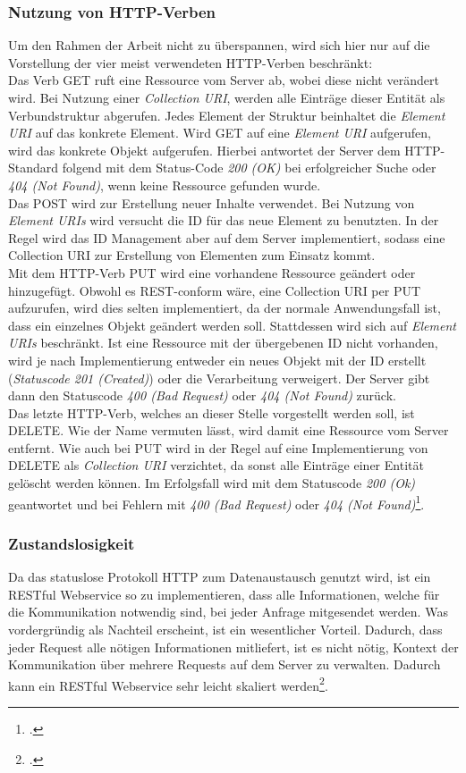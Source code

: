 \subsubsection*{Nutzung von HTTP-Verben}
Um den Rahmen der Arbeit nicht zu überspannen, wird sich hier nur auf die Vorstellung der vier meist verwendeten \ac{HTTP}-Verben beschränkt:\\
Das Verb GET ruft eine Ressource vom Server ab, wobei diese nicht verändert wird. Bei Nutzung einer \textit{Collection \ac{URI}}, werden alle Einträge dieser Entität als Verbundstruktur abgerufen. Jedes Element der Struktur beinhaltet die \textit{Element URI} auf das konkrete Element. Wird GET auf eine \textit{Element URI} aufgerufen, wird das konkrete Objekt aufgerufen. Hierbei antwortet der Server dem \ac{HTTP}-Standard folgend mit dem Status-Code \textit{200 (OK)} bei erfolgreicher Suche oder \textit{404 (Not Found)}, wenn keine Ressource gefunden wurde.\\
Das POST wird zur Erstellung neuer Inhalte verwendet. Bei Nutzung von \textit{Element \ac{URI}s} wird versucht die ID für das neue Element zu benutzten. In der Regel wird das ID Management aber auf dem Server implementiert, sodass eine Collection \ac{URI} zur Erstellung von Elementen zum Einsatz kommt.\\
Mit dem HTTP-Verb PUT wird eine vorhandene Ressource geändert oder hinzugefügt. Obwohl es \ac{REST}-conform wäre, eine Collection \ac{URI} per PUT aufzurufen, wird dies selten implementiert, da der normale Anwendungsfall ist, dass ein einzelnes Objekt geändert werden soll. Stattdessen wird sich auf \textit{Element \ac{URI}s} beschränkt. Ist eine Ressource mit der übergebenen ID nicht vorhanden, wird je nach Implementierung entweder ein neues Objekt mit der ID erstellt (\textit{Statuscode 201 (Created)}) oder die Verarbeitung verweigert. Der Server gibt dann den Statuscode \textit{400 (Bad Request)} oder \textit{404 (Not Found)}  zurück. \\
Das letzte HTTP-Verb, welches an dieser Stelle vorgestellt werden soll, ist DELETE. Wie der Name vermuten lässt, wird damit eine Ressource vom Server entfernt. Wie auch bei PUT wird in der Regel auf eine Implementierung von DELETE als \textit{Collection \ac{URI}} verzichtet, da sonst alle Einträge einer Entität gelöscht werden können. Im Erfolgsfall wird mit dem Statuscode \textit{200 (Ok)} geantwortet und bei Fehlern mit \textit{400 (Bad Request)} oder \textit{404 (Not Found)}\footcite[S. 26ff.]{REST-und-HTTP}.
\subsubsection*{Zustandslosigkeit}
Da das statuslose Protokoll \ac{HTTP} zum Datenaustausch genutzt wird, ist ein \ac{REST}ful Webservice so zu implementieren, dass alle Informationen, welche für die Kommunikation notwendig sind, bei jeder Anfrage mitgesendet werden. Was vordergründig als Nachteil erscheint, ist ein wesentlicher Vorteil. Dadurch, dass jeder Request alle nötigen Informationen mitliefert, ist es nicht nötig, Kontext der Kommunikation über mehrere Requests auf dem Server zu verwalten. Dadurch kann ein \ac{REST}ful Webservice sehr leicht skaliert werden\footcite[S. 26ff.]{REST-und-HTTP}.
